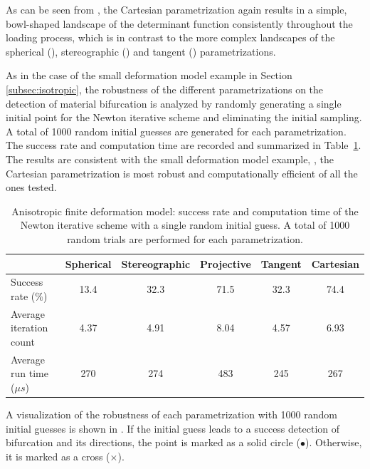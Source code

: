 \documentclass[12pt]{article}
\numberwithin{equation}{section}
\begin{document}
As can be seen from , the Cartesian
parametrization again results in a simple, bowl-shaped landscape of
the determinant function consistently throughout the loading process,
which is in contrast to the more complex landscapes of the spherical
(), stereographic
() and tangent
() parametrizations.

As in the case of the small deformation model example in Section
\ref{subsec:isotropic}, the robustness of the different
parametrizations on the detection of material bifurcation is analyzed
by randomly generating a single initial point for the Newton iterative
scheme and eliminating the initial sampling. A total of 1000 random
initial guesses are generated for each parametrization. The success
rate and computation time are recorded and summarized in
Table~\ref{tab:aniso-axial-random-para}. The results are consistent
with the small deformation model example, \ie, the Cartesian
parametrization is most robust and computationally efficient of all
the ones tested.

\begin{table}[!htbp]
 \begin{center}
  \begin{tabular}{l | c c c c c}
    \toprule
    & Spherical & Stereographic & Projective & Tangent & Cartesian     \\
    \midrule
    Success rate ($\%$)      & 13.4 & 32.3  & 71.5  & 32.3  &  74.4   \\
    Average iteration count    & 4.37 & 4.91 & 8.04  & 4.57 & 6.93   \\
    Average run time (${\mu}s$)  & 270  & 274  & 483  & 245  & 267   \\
    \bottomrule
  \end{tabular}
  \caption{Anisotropic finite deformation model: success rate and
    computation time of the Newton iterative scheme with a single random
    initial guess. A total of 1000 random trials are performed for
    each parametrization.}
    \label{tab:aniso-axial-random-para}
 \end{center}
\end{table}

A visualization of the robustness of each parametrization with 1000
random initial guesses is shown in
. If the initial guess leads to a
success detection of bifurcation and its directions, the point is
marked as a solid circle ($\bullet$). Otherwise, it is marked as a
cross ($\times$).
\end{document}
